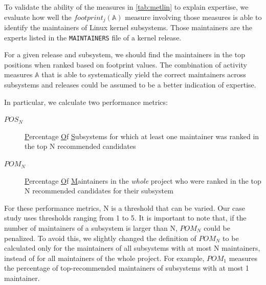 
To validate the ability of the measures in \autoref{tab:metlin} to explain expertise, we evaluate how well the $footprint_j(\mathbb{A})$ measure involving those measures is able to identify the maintainers of Linux kernel subsystems. Those maintainers are the experts listed in the \texttt{MAINTAINERS} file of a kernel release.

For a given release and subsystem, %
we should find the maintainers in the top positions when ranked based on footprint values. The combination of activity measures $\mathbb{A}$ that is able to systematically yield the correct maintainers across subsystems and releases could be assumed to be a better indication of expertise. 

In particular, we calculate two performance metrics:
\begin{description}
\item[$POS_N$] \underline{P}ercentage \underline{O}f \underline{S}ubsystems for which at least one maintainer was ranked in the top N recommended candidates
\item[$POM_N$] \underline{P}ercentage \underline{O}f \underline{M}aintainers in the {\em whole} project who were ranked in the top N recommended candidates for their subsystem
\end{description}

For these performance metrics, N is a threshold that can be varied. Our case study uses thresholds ranging from 1 to 5. It is important to note that, if the number of maintainers of a subsystem is larger than N, $POM_N$ could be penalized. To avoid this, we slightly changed the definition of $POM_N$ to be calculated only for the maintainers of all subsystems with at most N maintainers, instead of for all maintainers of the whole project. For example, $POM_1$ measures the percentage of top-recommended maintainers of subsystems with at most 1 maintainer.%

